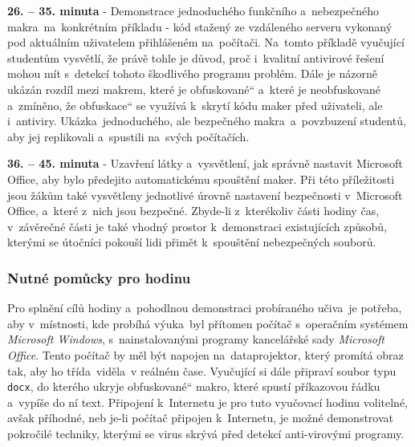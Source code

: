 \documentclass[a4paper, 12pt]{article}
\providecommand{\uv}[1]{\quotedblbase #1\textquotedblleft}
\begin{document}
\textbf{26. -- 35. minuta} - Demonstrace jednoduchého funkčního a~nebezpečného makra~na~konkrétním příkladu - kód stažený ze vzdáleného serveru vykonaný pod aktuálním uživatelem přihlášeném na~počítači. Na~tomto příkladě vyučující studentům vysvětlí, že právě tohle je důvod, proč i~kvalitní antivirové řešení mohou mít s~detekcí tohoto škodlivého programu problém. Dále je názorně ukázán rozdíl mezi makrem, které je \uv{obfuskované} a~které je neobfuskované a~zmíněno, že \uv{obfuskace} se využívá k~skrytí kódu maker před uživateli, ale i~antiviry. Ukázka~jednoduchého, ale bezpečného makra~a~povzbuzení studentů, aby jej replikovali a~spustili na~svých počítačích.

\textbf{36. -- 45. minuta} - Uzavření látky a~vysvětlení, jak správně nastavit Microsoft Office, aby bylo předejito automatickému spouštění maker. Při této příležitosti jsou žákům také vysvětleny jednotlivé úrovně nastavení bezpečnosti v~Microsoft Office, a~které z~nich jsou bezpečné. Zbyde-li z~kterékoliv části hodiny čas, v~závěrečné části je také vhodný prostor k~demonstraci existujících způsobů, kterými se útočníci pokouší lidi přimět k~spouštění nebezpečných souborů. 

\subsubsection{Nutné pomůcky pro hodinu}
Pro splnění cílů hodiny a~pohodlnou demonstraci probíraného učiva~je potřeba, aby v~místnosti, kde probíhá výuka~byl přítomen počítač s~operačním systémem \textit{Microsoft Windows}, s~nainstalovanými programy kancelářské sady \textit{Microsoft Office}. Tento počítač by měl být napojen na~dataprojektor, který promítá obraz tak, aby ho třída~viděla~v reálném čase. Vyučující si dále připraví soubor typu \texttt{docx}, do kterého ukryje \uv{obfuskované} makro, které spustí příkazovou řádku a~vypíše do ní text. Připojení k~Internetu je pro tuto vyučovací hodinu volitelné, avšak příhodné, neb je-li počítač připojen k~Internetu, je možné demonstrovat pokročilé techniky, kterými se virus skrývá před detekcí anti-virovými programy.

\newpage
\end{document}
